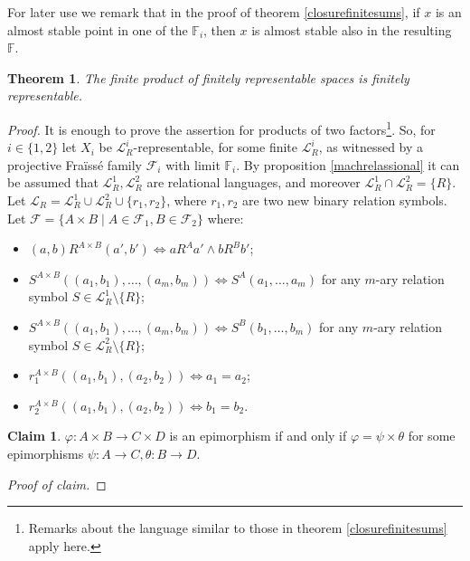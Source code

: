\documentclass[12pt,twoside,a4paper]{amsart}
\theoremstyle{plain}
\newtheorem{theorem}{Theorem}
\theoremstyle{definition}
\newtheorem{claim}{Claim}[theorem]
\begin{document}
For later use we remark that in the proof of theorem \ref{closurefinitesums}, if $x$ is an almost stable point in one of the $ \mathbb F_i$, then $x$ is almost stable also in the resulting $ \mathbb F $.

\begin{theorem} \label{products}
The finite product of finitely representable spaces is finitely representable.
\end{theorem}

\begin{proof}
It is enough to prove the assertion for products of two factors\footnote{Remarks about the language similar to those in theorem \ref{closurefinitesums} apply here.}.
So, for $i\in\{ 1,2\} $ let $X_i$ be $ \mathcal L_R^i$-representable, for some finite $ \mathcal L_R^i$, as witnessed by a projective Fra\"iss\'e family $ \mathcal F_i$ with limit $ \mathbb F_i$.
By proposition \ref{machrelassional} it can be assumed that $ \mathcal L_R^1, \mathcal L_R^2$ are relational languages, and moreover $ \mathcal L_R^1\cap \mathcal L_R^2=\{ R\} $.
Let $ \mathcal L_R= \mathcal L_R^1\cup \mathcal L_R^2\cup\{ r_1,r_2\} $, where $r_1,r_2$ are two new binary relation symbols.
Let $ \mathcal F =\{ A\times B\mid A\in \mathcal F_1,B\in \mathcal F_2\} $ where:
\begin{itemize}
\item $(a,b)R^{A\times B}(a',b')\Leftrightarrow aR^Aa'\wedge bR^Bb'$;
\item $S^{A\times B}((a_1,b_1),\ldots ,(a_m,b_m))\Leftrightarrow S^A(a_1,\ldots ,a_m)$ for any $m$-ary relation symbol $S\in \mathcal L_R^1\setminus\{ R\} $;
\item $S^{A\times B}((a_1,b_1),\ldots ,(a_m,b_m))\Leftrightarrow S^B(b_1,\ldots ,b_m)$ for any $m$-ary relation symbol $S\in \mathcal L_R^2\setminus\{ R\} $;
\item $r_1^{A\times B}((a_1,b_1),(a_2,b_2))\Leftrightarrow a_1=a_2$;
\item $r_2^{A\times B}((a_1,b_1),(a_2,b_2))\Leftrightarrow b_1=b_2$.
\end{itemize}

\begin{claim}
$ {\varphi} :A\times B\to C\times D$ is an epimorphism if and only if $ {\varphi} =\psi\times\theta $ for some epimorphisms $\psi :A\to C,\theta :B\to D$.
\end{claim}

{\it Proof of claim.}


\end{proof}
\end{document}
